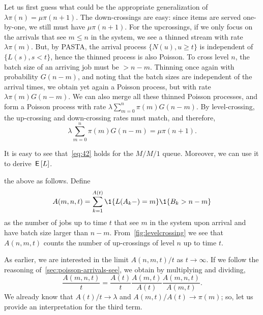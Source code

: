 Let us first guess what could be the appropriate generalization of $\lambda \pi(n) = \mu \pi(n+1)$.
The down-crossings are easy: since items are served one-by-one, we still must have $\mu \pi(n+1)$.
For the upcrossings, if we only focus on the arrivals that see $m\leq n$ in the system, we see a thinned stream
 with rate $\lambda \pi(m)$.
But, by PASTA, the arrival process $\{N(u), u\geq t\}$ is independent of $\{L(s), s< t\}$, hence the thinned process is also Poisson.
To cross level $n$, the batch size of an arriving job must be $>n-m$.
Thinning once again with probability $G(n-m)$, and noting that the batch sizes are independent of the arrival times, we obtain  yet again a Poisson process, but with rate $\lambda \pi(m) G(n-m)$.
We can also merge all these thinned Poisson processes, and form a Poisson process with rate $\lambda \sum_{m=0}^n \pi(m) G(n-m)$.
By level-crossing, the up-crossing and down-crossing rates must match, and therefore,
\begin{equation}\label{eq:42}
\lambda \sum_{m=0}^n \pi(m) G(n-m) = \mu \pi(n+1).
\end{equation}

It is easy to see that~\cref{eq:42} holds for the $M/M/1$ queue.
Moreover, we can use it to derive $\,\mathsf{E}\left[L\right]$.

 the above as follows.
Define
\begin{equation*}
 A(m,n,t) = \sum_{k=1}^{A(t)}\1{\L(A_k-) = m}\1{B_k > n-m}
\end{equation*}
as the number of jobs up to time $t$ that see $m$ in the system upon arrival and have batch size larger than $n-m$.
From~\cref{fig:levelcrossing} we see that $A(n,m,t)$ counts the number of up-crossings of level $n$ up to time $t$.

As earlier, we are interested in the limit $A(n,m,t)/t$ as $t\to\infty$.
If we follow the reasoning of~\cref{sec:poisson-arrivals-see}, we obtain by multiplying and dividing,
\begin{equation}\label{eq:16}
 \frac{A(m,n,t)}t = \frac{A(t)}t \frac{A(m,t)}{A(t)}\frac{A(m,n,t)}{A(m,t)}.
\end{equation}
We already know that $A(t)/t\to\lambda$ and $A(m,t)/A(t)\to\pi(m)$; so, let us  provide  an interpretation for the third term.

